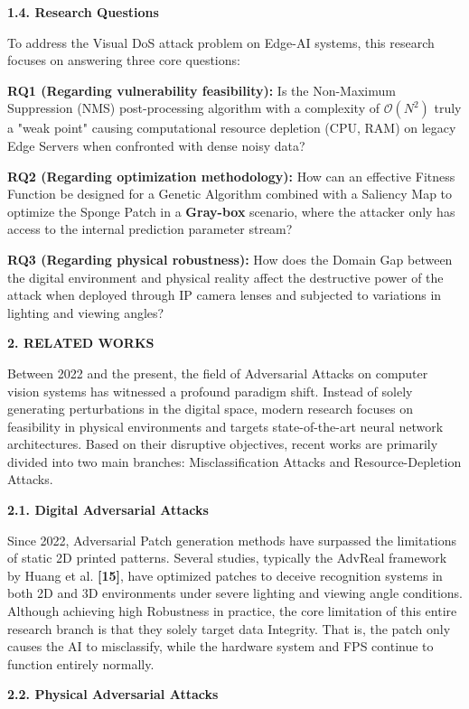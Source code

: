 \documentclass[]{article}
\begin{document}
\textbf{1.4. Research Questions}

To address the Visual DoS attack problem on Edge-AI systems, this research focuses on answering three core questions:

\textbf{RQ1 (Regarding vulnerability feasibility):} Is the Non-Maximum Suppression (NMS) post-processing algorithm with a complexity of \(\mathcal{O}\left( N^{2} \right)\) truly a "weak point" causing computational resource depletion (CPU, RAM) on legacy Edge Servers when confronted with dense noisy data?

\textbf{RQ2 (Regarding optimization methodology):} How can an effective Fitness Function be designed for a Genetic Algorithm combined with a Saliency Map to optimize the Sponge Patch in a \textbf{Gray-box} scenario, where the attacker only has access to the internal prediction parameter stream?

\textbf{RQ3 (Regarding physical robustness):} How does the Domain Gap between the digital environment and physical reality affect the destructive power of the attack when deployed through IP camera lenses and subjected to variations in lighting and viewing angles?

\textbf{2. RELATED WORKS}

Between 2022 and the present, the field of Adversarial Attacks on computer vision systems has witnessed a profound paradigm shift. Instead of solely generating perturbations in the digital space, modern research focuses on feasibility in physical environments and targets state-of-the-art neural network architectures. Based on their disruptive objectives, recent works are primarily divided into two main branches: Misclassification Attacks and Resource-Depletion Attacks.

\textbf{2.1. Digital Adversarial Attacks}

Since 2022, Adversarial Patch generation methods have surpassed the limitations of static 2D printed patterns. Several studies, typically the AdvReal framework by Huang et al. \textbf{{[}15{]}}, have optimized patches to deceive recognition systems in both 2D and 3D environments under severe lighting and viewing angle conditions. Although achieving high Robustness in practice, the core limitation of this entire research branch is that they solely target data Integrity. That is, the patch only causes the AI to misclassify, while the hardware system and FPS continue to function entirely normally.

\textbf{2.2. Physical Adversarial Attacks}
\end{document}
